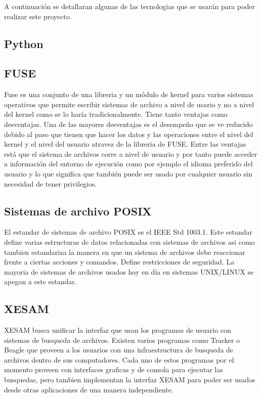 A continuación se detallaran algunas de las tecnologias que se usarán para poder realizar este proyecto.

\subsection{Python}



\subsection{FUSE}

Fuse es una conjunto de una libreria y un módulo de kernel para varios sistemas operativos que permite escribir sistemas de archivo a nivel de usario y no a nivel del kernel como se lo haría tradicionalmente. Tiene tanto ventajas como desventajas. Una de las mayores desventajas es el desempeño que se ve reducido debido al paso que tienen que hacer los datos y las operaciones entre el nivel del kernel y el nivel del usuario atravez de la libreria de FUSE. Entre las ventajas está que el sistema de archivos corre a nivel de usuario y por tanto puede acceder a información del entorno de ejecución como por ejemplo el idioma preferido del usuario y lo que significa que también puede ser usado por cualquier usuario sin necesidad de tener privilegios.

\subsection{Sistemas de archivo POSIX}

El estandar de sistemas de archivo POSIX es el IEEE Std 1003.1. Este estandar define varias estructuras de datos relacionadas con sistemas de archivos asi como tambien estandariza la manera en que un sistema de archivos debe reaccionar frente a ciertas acciones y comandos. Define restricciones de seguridad. La mayoria de sistemas de archivos usados hoy en día en sistemas UNIX/LINUX se apegan a este estandar.

\subsection{XESAM}

XESAM busca unificar la interfaz que usan los programas de usuario con sistemas de busqueda de archivos. Existen varios programas como Tracker o Beagle que proveen a los usuarios con una infraestructura de busqueda de archivos dentro de sus computadores. Cada uno de estos programas por el momento proveen con interfaces graficas y de consola para ejecutar las busquedas, pero tambien implementan la interfaz XESAM para poder ser usados desde otras aplicaciones de una manera independiente.



